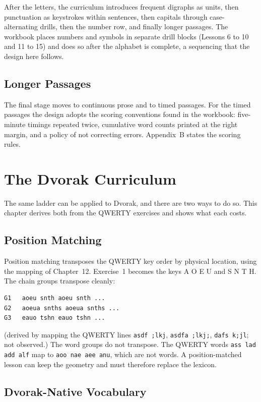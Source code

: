 After the letters, the curriculum introduces frequent digraphs as units, then punctuation as keystrokes within sentences, then capitals through case-alternating drills, then the number row, and finally longer passages. The workbook places numbers and symbols in separate drill blocks (Lessons 6 to 10 and 11 to 15) and does so after the alphabet is complete, a sequencing that the design here follows.

\section{Longer Passages}

The final stage moves to continuous prose and to timed passages. For the timed passages the design adopts the scoring conventions found in the workbook: five-minute timings repeated twice, cumulative word counts printed at the right margin, and a policy of not correcting errors. Appendix~B states the scoring rules.

\chapter{The Dvorak Curriculum}
\label{ch:dvorakcurr}

The same ladder can be applied to Dvorak, and there are two ways to do so. This chapter derives both from the QWERTY exercises and shows what each costs.

\section{Position Matching}

Position matching transposes the QWERTY key order by physical location, using the mapping of Chapter~12. Exercise~1 becomes the keys A O E U and S N T H. The chain groups transpose cleanly:

\begin{Verbatim}
G1   aoeu snth aoeu snth ...
G2   aoeua snths aoeua snths ...
G3   eauo tshn eauo tshn ...
\end{Verbatim}

(derived by mapping the QWERTY lines \texttt{asdf ;lkj}, \texttt{asdfa ;lkj;}, \texttt{dafs k;jl}; not observed.) The word groups do not transpose. The QWERTY words \texttt{ass lad add alf} map to \texttt{aoo nae aee anu}, which are not words. A position-matched lesson can keep the geometry and must therefore replace the lexicon.

\section{Dvorak-Native Vocabulary}

